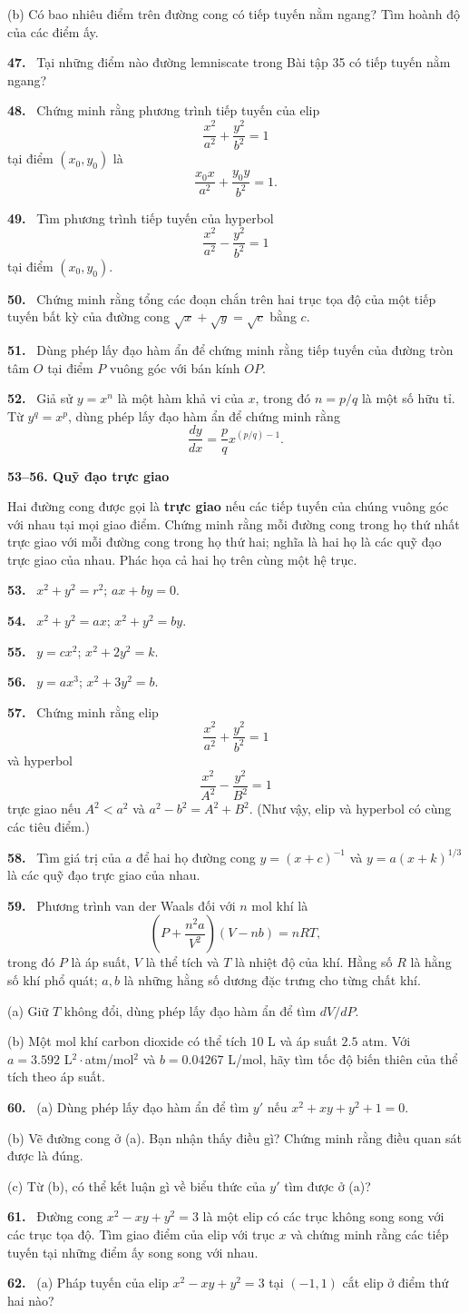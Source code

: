 \documentclass[12pt,a4paper]{article}
\newcommand{\bt}[1]{\par\smallskip\noindent\textbf{#1.}\ }
\newcommand{\group}[1]{\par\medskip\noindent\textbf{#1}\par\nopagebreak[4]}
\begin{document}
(b) Có bao nhiêu điểm trên đường cong có tiếp tuyến nằm ngang? Tìm hoành độ của các điểm ấy.
\bt{47} Tại những điểm nào đường lemniscate trong Bài tập 35 có tiếp tuyến nằm ngang?
\bt{48} Chứng minh rằng phương trình tiếp tuyến của elip
\[\frac{x^2}{a^2}+\frac{y^2}{b^2}=1\]
tại điểm $(x_0,y_0)$ là
\[\frac{x_0x}{a^2}+\frac{y_0y}{b^2}=1.\]
\bt{49} Tìm phương trình tiếp tuyến của hyperbol
\[\frac{x^2}{a^2}-\frac{y^2}{b^2}=1\]
tại điểm $(x_0,y_0)$.
\bt{50} Chứng minh rằng tổng các đoạn chắn trên hai trục tọa độ của một tiếp tuyến bất kỳ của đường cong $\sqrt x+\sqrt y=\sqrt c$ bằng $c$.
\bt{51} Dùng phép lấy đạo hàm ẩn để chứng minh rằng tiếp tuyến của đường tròn tâm $O$ tại điểm $P$ vuông góc với bán kính $OP$.
\bt{52} Giả sử $y=x^n$ là một hàm khả vi của $x$, trong đó $n=p/q$ là một số hữu tỉ. Từ $y^q=x^p$, dùng phép lấy đạo hàm ẩn để chứng minh rằng
\[\frac{dy}{dx}=\frac pq x^{(p/q)-1}.\]
\group{53–56. Quỹ đạo trực giao} Hai đường cong được gọi là \textbf{trực giao} nếu các tiếp tuyến của chúng vuông góc với nhau tại mọi giao điểm. Chứng minh rằng mỗi đường cong trong họ thứ nhất trực giao với mỗi đường cong trong họ thứ hai; nghĩa là hai họ là các quỹ đạo trực giao của nhau. Phác họa cả hai họ trên cùng một hệ trục.
\bt{53} $x^2+y^2=r^2$; \quad $ax+by=0$.
\bt{54} $x^2+y^2=ax$; \quad $x^2+y^2=by$.
\bt{55} $y=cx^2$; \quad $x^2+2y^2=k$.
\bt{56} $y=ax^3$; \quad $x^2+3y^2=b$.
\bt{57} Chứng minh rằng elip
\[\frac{x^2}{a^2}+\frac{y^2}{b^2}=1\]
và hyperbol
\[\frac{x^2}{A^2}-\frac{y^2}{B^2}=1\]
trực giao nếu $A^2<a^2$ và $a^2-b^2=A^2+B^2$. (Như vậy, elip và hyperbol có cùng các tiêu điểm.)
\bt{58} Tìm giá trị của $a$ để hai họ đường cong $y=(x+c)^{-1}$ và $y=a(x+k)^{1/3}$ là các quỹ đạo trực giao của nhau.
\bt{59} Phương trình van der Waals đối với $n$ mol khí là
\[\left(P+\frac{n^2a}{V^2}\right)(V-nb)=nRT,\]
trong đó $P$ là áp suất, $V$ là thể tích và $T$ là nhiệt độ của khí. Hằng số $R$ là hằng số khí phổ quát; $a,b$ là những hằng số dương đặc trưng cho từng chất khí.

(a) Giữ $T$ không đổi, dùng phép lấy đạo hàm ẩn để tìm $dV/dP$.

(b) Một mol khí carbon dioxide có thể tích $10$ L và áp suất $2.5$ atm. Với $a=3.592$ L$^2\!\cdot$atm/mol$^2$ và $b=0.04267$ L/mol, hãy tìm tốc độ biến thiên của thể tích theo áp suất.
\bt{60} (a) Dùng phép lấy đạo hàm ẩn để tìm $y'$ nếu $x^2+xy+y^2+1=0$.

(b) Vẽ đường cong ở (a). Bạn nhận thấy điều gì? Chứng minh rằng điều quan sát được là đúng.

(c) Từ (b), có thể kết luận gì về biểu thức của $y'$ tìm được ở (a)?
\bt{61} Đường cong $x^2-xy+y^2=3$ là một elip có các trục không song song với các trục tọa độ. Tìm giao điểm của elip với trục $x$ và chứng minh rằng các tiếp tuyến tại những điểm ấy song song với nhau.
\bt{62} (a) Pháp tuyến của elip $x^2-xy+y^2=3$ tại $(-1,1)$ cắt elip ở điểm thứ hai nào?
\end{document}

